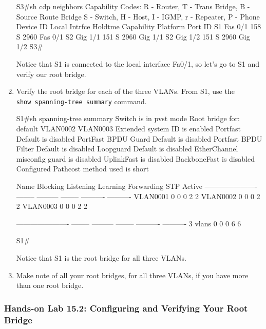 \begin{enumerate}
\begin{cli}
S3#sh cdp neighbors
Capability Codes: R - Router, T - Trans Bridge, B - Source Route Bridge
                  S - Switch, H - Host, I - IGMP, r - Repeater, P - Phone
Device ID    Local Intrfce   Holdtme    Capability   Platform    Port ID
S1           Fas 0/1          158            S       2960        Fas 0/1
S2           Gig 1/1          151            S       2960        Gig 1/1
S2           Gig 1/2          151            S       2960        Gig 1/2
S3#
\end{cli}

  Notice that S1 is connected to the local interface Fa0/1, so let's go
  to S1 and verify our root bridge.
\item
  Verify the root bridge for each of the three VLANs. From S1, use the
  \texttt{show\ spanning-tree\ summary} command.

\begin{cli}
S1#sh spanning-tree summary
Switch is in pvst mode
Root bridge for: default VLAN0002 VLAN0003
Extended system ID           is enabled
Portfast Default             is disabled
PortFast BPDU Guard Default  is disabled
Portfast BPDU Filter Default is disabled
Loopguard Default            is disabled
EtherChannel misconfig guard is disabled
UplinkFast                   is disabled
BackboneFast                 is disabled
Configured Pathcost method used is short
 
Name                   Blocking Listening Learning Forwarding STP Active
---------------------- -------- --------- -------- ---------- ----------
VLAN0001                     0         0        0          2          2
VLAN0002                     0         0        0          2          2
VLAN0003                     0         0        0          2          2
 
---------------------- -------- --------- -------- ---------- ----------
3 vlans                      0         0        0          6          6
 
S1#
\end{cli}

  Notice that S1 is the root bridge for all three VLANs.
\item
  Make note of all your root bridges, for all three VLANs, if you have
  more than one root bridge.
\end{enumerate}

\subsubsection[Hands-on Lab 15.2: Configuring and Verifying Your Root
Bridge]{\texorpdfstring{\protect\hypertarget{c15.xhtmlux5cux23c15-sec-26}{}{}Hands-on
Lab 15.2: Configuring and Verifying Your Root
Bridge}{Hands-on Lab 15.2: Configuring and Verifying Your Root Bridge}}

